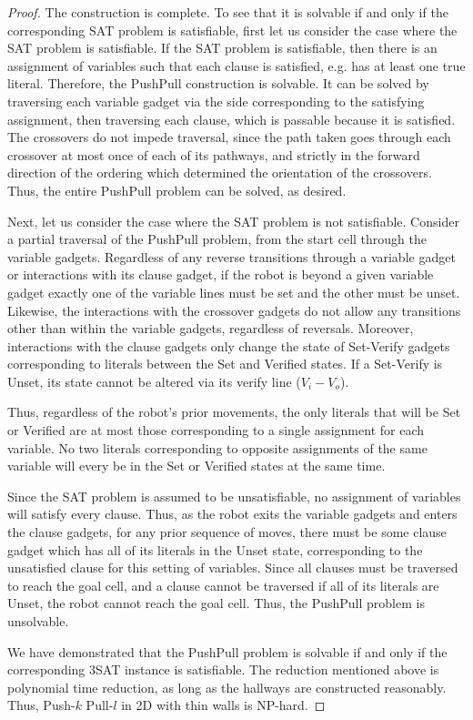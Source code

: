 \begin{proof}
    The construction is complete. To see that it is solvable if and only if the corresponding SAT problem is satisfiable, first let us consider the case where the SAT problem is satisfiable. If the SAT problem is satisfiable, then there is an assignment of variables such that each clause is satisfied, e.g. has at least one true literal. Therefore, the PushPull construction is solvable. It can be solved by traversing each variable gadget via the side corresponding to the satisfying assignment, then traversing each clause, which is passable because it is satisfied. The crossovers do not impede traversal, since the path taken goes through each crossover at most once of each of its pathways, and strictly in the forward direction of the ordering which determined the orientation of the crossovers. Thus, the entire PushPull problem can be solved, as desired.

    Next, let us consider the case where the SAT problem is not satisfiable. Consider a partial traversal of the PushPull problem, from the start cell through the variable gadgets. Regardless of any reverse transitions through a variable gadget or interactions with its clause gadget, if the robot is beyond a given variable gadget exactly one of the variable lines must be set and the other must be unset. Likewise, the interactions with the crossover gadgets do not allow any transitions other than within the variable gadgets, regardless of reversals. Moreover, interactions with the clause gadgets only change the state of Set-Verify gadgets corresponding to literals between the Set and Verified states. If a Set-Verify is Unset, its state cannot be altered via its verify line ($V_i - V_o$).

    Thus, regardless of the robot's prior movements, the only literals that will be Set or Verified are at most those corresponding to a single assignment for each variable. No two literals corresponding to opposite assignments of the same variable will every be in the Set or Verified states at the same time. 

    Since the SAT problem is assumed to be unsatisfiable, no assignment of variables will satisfy every clause. Thus, as the robot exits the variable gadgets and enters the clause gadgets, for any prior sequence of moves, there must be some clause gadget which has all of its literals in the Unset state, corresponding to the unsatisfied clause for this setting of variables. Since all clauses must be traversed to reach the goal cell, and a clause cannot be traversed if all of its literals are Unset, the robot cannot reach the goal cell. Thus, the PushPull problem is unsolvable.

    We have demonstrated that the PushPull problem is solvable if and only if the corresponding 3SAT instance is satisfiable. The reduction mentioned above is polynomial time reduction, as long as the hallways are constructed reasonably. Thus, Push-$k$ Pull-$l$ in 2D with thin walls is NP-hard.


\end{proof}

